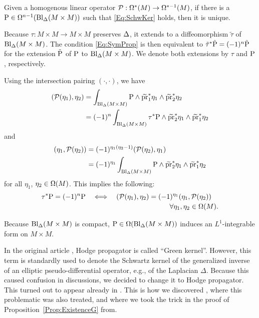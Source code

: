 \documentclass[\MainFolder/Text.tex]{subfiles}
\begin{document}
\begin{Remark}\label{Rem:GKer}
\begin{RemarkList}
\item Given a homogenous linear operator $\mathcal{P}: \Omega^*(M) \rightarrow \Omega^{*-1}(M)$, if there is a $\mathrm{P} \in \Omega^{n-1}(\mathrm{Bl}_{\Delta}(M\times M))$ such that \eqref{Eq:SchwKer} holds, then it is unique.
\item Because $\tau: M\times M \rightarrow M\times M$ preserves $\Delta$, it extends to a diffeomorphism $\tilde{\tau}$ of $\mathrm{Bl}_\Delta(M\times M)$. The condition \eqref{Eq:SymProp} is then equivalent to $\tilde{\tau}^*\tilde{\mathrm{P}} = (-1)^n \tilde{\mathrm{P}}$ for the extension $\tilde{\mathrm{P}}$ of $\mathrm{P}$ to $\mathrm{Bl}_{\Delta}(M\times M)$. We denote both extensions by $\tau$ and $\mathrm{P}$, respectively.

\item Using the intersection pairing $(\cdot,\cdot)$, we have 
$$ \begin{aligned}(\mathcal{P}(\eta_1),\eta_2) &= \int_{\mathrm{Bl}_{\Delta}(M\times M)} \mathrm{P} \wedge \widetilde{\operatorname{\mathrm{pr}}}_1^*\eta_1 \wedge \widetilde{\operatorname{\mathrm{pr}}}_2^*\eta_2 \\ 
&= (-1)^n \int_{\mathrm{Bl}_{\Delta}(M\times M)} \tau^*\mathrm{P} \wedge \widetilde{\operatorname{\mathrm{pr}}}_2^*\eta_1 \wedge \widetilde{\operatorname{\mathrm{pr}}}_1^*\eta_2 \end{aligned}$$
and 
$$ \begin{aligned}(\eta_1, \mathcal{P}(\eta_2)) &= (-1)^{\eta_1(\eta_2 - 1)} (\mathcal{P}(\eta_2),\eta_1) \\ &= (-1)^{\eta_1} \int_{\mathrm{Bl}_\Delta(M\times M)} \mathrm{P} \wedge \widetilde{\operatorname{\mathrm{pr}}}_2^* \eta_1 \wedge \widetilde{\operatorname{\mathrm{pr}}}_1^* \eta_2 \end{aligned}$$
for all $\eta_1$, $\eta_2\in \Omega(M)$. This implies the following:
\begin{equation}\label{Eq:GSA}
\tau^* \Prpg = (-1)^n \Prpg \quad \Longleftrightarrow \quad \begin{multlined}[t](\Htp(\eta_1),\eta_2) = (-1)^{\eta_1}(\eta_1, \Htp(\eta_2)) \\ \forall \eta_1, \eta_2 \in\DR(M). \end{multlined}
\end{equation}

\item Because $\mathrm{Bl}_\Delta(M\times M)$ is compact, $\mathrm{P}\in \Omega(\mathrm{Bl}_\Delta(M\times M))$ induces an $L^1$-integrable form on $M\times M$.

\item In the original article \cite{Cieliebak2015}, Hodge propagator is called ``Green kernel''. However, this term is standardly used to denote the Schwartz kernel of the generalized inverse of an elliptic pseudo-differential operator, e.g., of the Laplacian $\Delta$. Because this caused confusion in discussions, we decided to change it to Hodge propagator. This turned out to appear already in \cite{Cattaneo2015}. This is how we discovered \cite{Mnev2009}, where this problematic was also treated, and where we took the trick in the proof of Proposition~\ref{Prop:ExistenceG} from.
\qedhere
\end{RemarkList}
\end{Remark}
\end{document}
